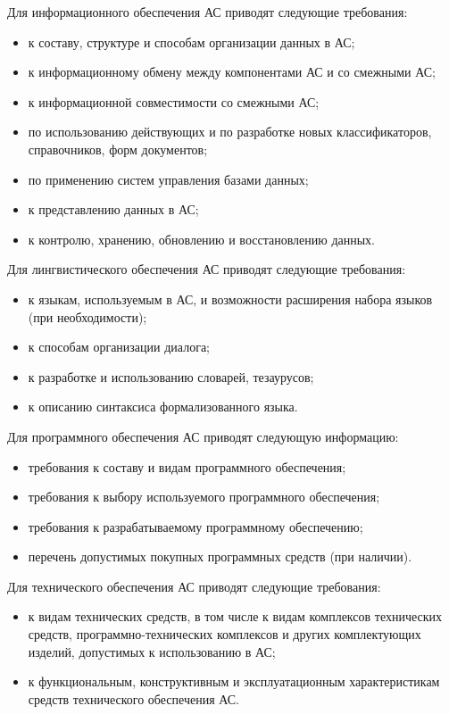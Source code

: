 {Для информационного обеспечения АС приводят следующие требования:
\begin{itemize}
  \item к составу, структуре и способам организации данных в АС;
  \item к информационному обмену между компонентами АС и со смежными АС;
  \item к информационной совместимости со смежными АС;
  \item по использованию действующих и по разработке новых классификаторов, справочников, форм документов;
  \item по применению систем управления базами данных;
  \item к представлению данных в АС;
  \item к контролю, хранению, обновлению и восстановлению данных.
\end{itemize}
Для лингвистического обеспечения АС приводят следующие требования:
\begin{itemize}
  \item к языкам, используемым в АС, и возможности расширения набора языков (при необходимости);
  \item к способам организации диалога;
  \item к разработке и использованию словарей, тезаурусов;
  \item к описанию синтаксиса формализованного языка.
\end{itemize}
Для программного обеспечения АС приводят следующую информацию:
\begin{itemize}
  \item требования к составу и видам программного обеспечения;
  \item требования к выбору используемого программного обеспечения;
  \item требования к разрабатываемому программному обеспечению;
  \item перечень допустимых покупных программных средств (при наличии).
\end{itemize}
Для технического обеспечения АС приводят следующие требования:
\begin{itemize}
  \item к видам технических средств, в том числе к видам комплексов технических средств, программно-технических комплексов и других комплектующих изделий, допустимых к использованию в АС;
  \item к функциональным, конструктивным и эксплуатационным характеристикам средств технического обеспечения АС.

\end{itemize}}
